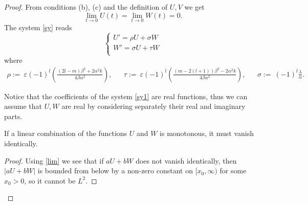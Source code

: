 \documentclass[12pt]{amsart}
\begin{document}
\begin{proof}
From conditions (b), (c) and the definition of $U,V$ we get
\begin{equation}\label{lim} \lim_{t\to 0}U(t)=\lim_{t\to 0}W(t)=0.
\end{equation}
The system \eqref{sy} reads 
\begin{equation}\label{sy1}\begin{cases}
U'=\rho U+\sigma W\\
W'=\sigma U +\tau W\\
\end{cases}
\end{equation}
where 
\begin{align*}\rho:=\ {\varepsilon}(-1)^l\left(\tfrac{(2l-m){\beta}^2+2{\alpha} ^2 k}{4{\beta}{\alpha}
  ^2}\right),&& \tau:=\ {\varepsilon}
(-1)^l\left(\tfrac{(m-2(l+1)){\beta}^2-2{\alpha} ^2 k}{4{\beta}{\alpha}
  ^2}\right),&& \sigma:=\ (-1)^l\tfrac{\lambda}{\alpha}.\end{align*}
  
Notice that the coefficients of the system \eqref{sy1} are real
functions, thus 
we can assume that $U,W$ are real by considering separately their 
real and imaginary parts.

\begin{lemma}\label{sig} 
If a linear combination of the functions $U$ and $W$ is monotonous, 
it must vanish identically.
\end{lemma} 
\begin{proof} Using \eqref{lim} we see that if $aU+bW$ does not 
vanish identically, then $|aU+bW|$ is bounded from below by a non-zero 
constant on $[x_0,\infty)$ for some $x_0>0$, so it cannot be $L^2$.
\end{proof}


\end{proof}
\end{document}
